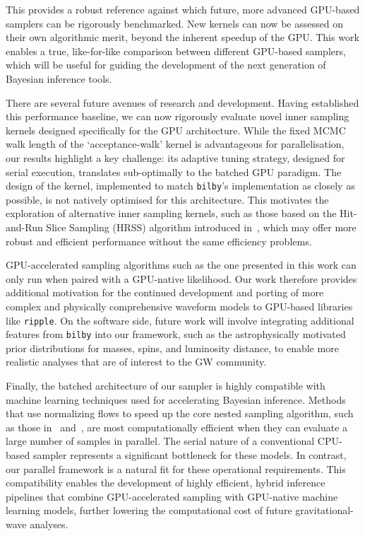 \documentclass[fleqn,usenatbib]{mnras}
\begin{document}
This provides a robust reference against which future, more advanced
GPU-based samplers can be rigorously benchmarked. New kernels can now be 
assessed on their own algorithmic merit, beyond
the inherent speedup of the GPU. This work enables a true,
like-for-like comparison between different GPU-based samplers, 
which will be useful for guiding the development
of the next generation of Bayesian inference tools.

There are several future avenues of research and development. 
Having established this performance baseline, we can now rigorously
evaluate novel inner sampling kernels designed specifically for the GPU
architecture. While the fixed MCMC walk length of the `acceptance-walk'
kernel is advantageous for parallelisation, our results highlight a key
challenge: its adaptive tuning strategy, designed for serial execution,
translates sub-optimally to the batched GPU paradigm. The design of the kernel,
implemented to match \texttt{bilby}'s implementation as closely as possible,
is not natively optimised for this
architecture. This motivates the exploration of alternative inner
sampling kernels, such as those based on the Hit-and-Run Slice Sampling
(HRSS) algorithm introduced in~\cite{yallup2025nested}, which may offer
more robust and efficient performance without the same efficiency problems.

GPU-accelerated sampling algorithms such as the one presented in this work can only run when
paired with a GPU-native likelihood. Our work therefore provides additional motivation for the continued development
and porting of more complex and physically comprehensive waveform models
to GPU-based libraries like \texttt{ripple}. On the software side, future
work will involve integrating additional features from \texttt{bilby}
into our framework, such as the astrophysically motivated prior
distributions for masses, spins, and luminosity distance, to enable 
more realistic analyses that are of interest to the GW community.

Finally, the batched architecture of our sampler is highly compatible
with machine learning techniques used for accelerating Bayesian
inference. Methods that use normalizing flows to speed up
the core nested sampling algorithm, such as those in~\cite{Williams2021Nessai} and~\cite{Prathaban}, are most
computationally efficient when they can evaluate a large number of
samples in parallel. The serial nature of a conventional CPU-based
sampler represents a significant bottleneck for these models. In
contrast, our parallel framework is a natural fit for these operational 
requirements. This compatibility enables the development of highly efficient,
hybrid inference pipelines that combine GPU-accelerated sampling with
GPU-native machine learning models, further lowering the computational
cost of future gravitational-wave analyses.
\end{document}
